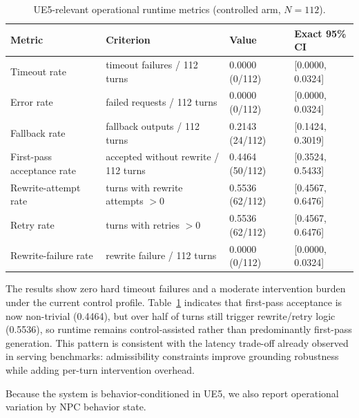 ﻿\documentclass[a4paper,12pt]{article}
\begin{document}
\begin{table}[t]
\centering
\caption{UE5-relevant operational runtime metrics (controlled arm, \(N=112\)).}
\label{tab:ue5_operational_metrics}
\begingroup
\footnotesize
\setlength{\tabcolsep}{4pt}
\begin{tabular}{p{}p{}p{}p{}}
\toprule
Metric & Criterion & Value & Exact 95\% CI \\
\midrule
Timeout rate & timeout failures / 112 turns & 0.0000 (0/112) & [0.0000, 0.0324] \\
Error rate & failed requests / 112 turns & 0.0000 (0/112) & [0.0000, 0.0324] \\
Fallback rate & fallback outputs / 112 turns & 0.2143 (24/112) & [0.1424, 0.3019] \\
First-pass acceptance rate & accepted without rewrite / 112 turns & 0.4464 (50/112) & [0.3524, 0.5433] \\
Rewrite-attempt rate & turns with rewrite attempts \(>0\) & 0.5536 (62/112) & [0.4567, 0.6476] \\
Retry rate & turns with retries \(>0\) & 0.5536 (62/112) & [0.4567, 0.6476] \\
Rewrite-failure rate & rewrite failure / 112 turns & 0.0000 (0/112) & [0.0000, 0.0324] \\
\bottomrule
\end{tabular}
\endgroup
\end{table}

The results show zero hard timeout failures and a moderate intervention burden under the current control profile. Table~\ref{tab:ue5_operational_metrics} indicates that first-pass acceptance is now non-trivial (0.4464), but over half of turns still trigger rewrite/retry logic (0.5536), so runtime remains control-assisted rather than predominantly first-pass generation. This pattern is consistent with the latency trade-off already observed in serving benchmarks: admissibility constraints improve grounding robustness while adding per-turn intervention overhead.

Because the system is behavior-conditioned in UE5, we also report operational variation by NPC behavior state.
\end{document}
